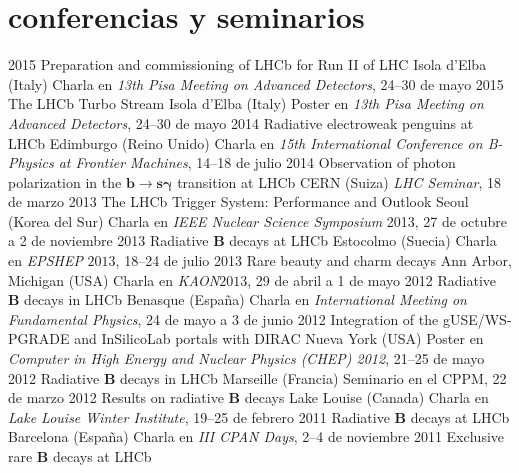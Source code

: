 {
\section{conferencias y seminarios}

    \cventry
        {2015}
        {Preparation and commissioning of LHCb for Run II of LHC}
        {Isola d'Elba (Italy)}
        {Charla en \emph{13th Pisa Meeting on Advanced Detectors}, 24--30 de mayo}
    \cventry
        {2015}
        {The LHCb Turbo Stream}
        {Isola d'Elba (Italy)}
        {Poster en \emph{13th Pisa Meeting on Advanced Detectors}, 24--30 de mayo}
    \cventry
        {2014}
        {Radiative electroweak penguins at LHCb}
        {Edimburgo (Reino Unido)}
        {Charla en \emph{15th International Conference on B-Physics at Frontier Machines}, 14--18 de julio}
    \cventry
        {2014}
        {Observation of photon polarization in the $\mathbf{b\to s\gamma}$ transition at LHCb}
        {CERN (Suiza)}
        {\emph{LHC Seminar}, 18 de marzo}
    \cventry
        {2013}
        {The LHCb Trigger System: Performance and Outlook}
        {Seoul (Korea del Sur)}
        {Charla en \emph{IEEE Nuclear Science Symposium} 2013, 27 de octubre a 2 de noviembre}
    \cventry
        {2013}
        {Radiative $\mathbf{B}$ decays at LHCb}
        {Estocolmo (Suecia)}
        {Charla en \emph{EPSHEP} $2013$, 18--24 de julio}
    \cventry
        {2013}
        {Rare beauty and charm decays}
        {Ann Arbor, Michigan (USA)}
        {Charla en \emph{KAON}$2013$, 29 de abril a 1 de mayo}
    \cventry
        {2012}
        {Radiative $\mathbf{B}$ decays in LHCb}
        {Benasque (España)}
        {Charla en \emph{International Meeting on Fundamental Physics}, 24 de mayo a 3 de junio}
    \cventry
        {2012}
        {Integration of the gUSE/WS-PGRADE and InSilicoLab portals with DIRAC}
        {Nueva York (USA)}
        {Poster en \emph{Computer in High Energy and Nuclear Physics (CHEP) 2012}, 21--25 de mayo}
    \cventry
        {2012}
        {Radiative $\mathbf{B}$ decays in LHCb}
        {Marseille (Francia)}
        {Seminario en el CPPM, 22 de marzo}
    \cventry
        {2012}
        {Results on radiative $\mathbf{B}$ decays}
        {Lake Louise (Canada)}
        {Charla en \emph{Lake Louise Winter Institute}, 19--25 de febrero}
    \cventry
        {2011}
        {Radiative $\mathbf{B}$ decays at LHCb}
        {Barcelona (España)}
        {Charla en \emph{III CPAN Days}, 2--4 de noviembre}
    \cventry
        {2011}
        {Exclusive rare $\mathbf{B}$ decays at LHCb}
}
